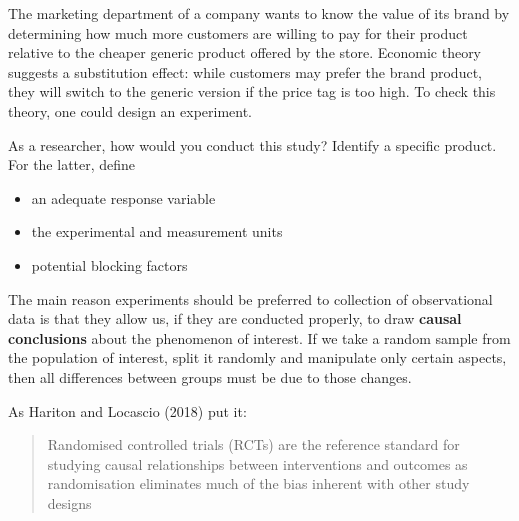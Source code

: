 \documentclass[
  11pt,
  letterpaper,
]{scrbook}
\providecommand{\tightlist}{%
  \setlength{\itemsep}{0pt}\setlength{\parskip}{0pt}}\usepackage{longtable,booktabs,array}
\theoremstyle{definition}
\theoremstyle{definition}
\theoremstyle{remark}
\begin{document}
\begin{tcolorbox}[enhanced jigsaw, left=2mm, leftrule=.75mm, coltitle=black, breakable, bottomrule=.15mm, colframe=quarto-callout-tip-color-frame, titlerule=0mm, colbacktitle=quarto-callout-tip-color!10!white, rightrule=.15mm, toprule=.15mm, title=\textcolor{quarto-callout-tip-color}{\faLightbulb}\hspace{0.5em}{Your turn}, opacityback=0, toptitle=1mm, bottomtitle=1mm, arc=.35mm, opacitybacktitle=0.6, colback=white]

The marketing department of a company wants to know the value of its
brand by determining how much more customers are willing to pay for
their product relative to the cheaper generic product offered by the
store. Economic theory suggests a substitution effect: while customers
may prefer the brand product, they will switch to the generic version if
the price tag is too high. To check this theory, one could design an
experiment.

As a researcher, how would you conduct this study? Identify a specific
product. For the latter, define

\begin{itemize}
\tightlist
\item
  an adequate response variable
\item
  the experimental and measurement units
\item
  potential blocking factors
\end{itemize}

\end{tcolorbox}

The main reason experiments should be preferred to collection of
observational data is that they allow us, if they are conducted
properly, to draw \textbf{causal conclusions} about the phenomenon of
interest. If we take a random sample from the population of interest,
split it randomly and manipulate only certain aspects, then all
differences between groups must be due to those changes.

As Hariton and Locascio (2018) put it:

\begin{quote}
Randomised controlled trials (RCTs) are the reference standard for
studying causal relationships between interventions and outcomes as
randomisation eliminates much of the bias inherent with other study
designs
\end{quote}
\end{document}
